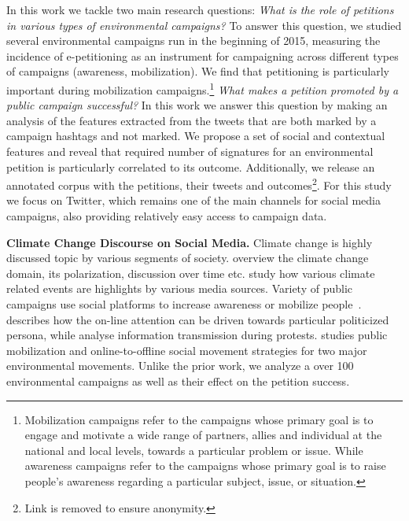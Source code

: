 In this work we tackle two main research questions: 
\textit{What is the role of petitions in various types of environmental campaigns?}
To answer this question, we studied several environmental campaigns run in the beginning of 2015, measuring the incidence of e-petitioning as an instrument for campaigning across different types of campaigns (awareness, mobilization). We find that petitioning is particularly important during mobilization campaigns.\footnote{Mobilization campaigns refer to the campaigns whose primary goal is to engage and motivate a wide range of partners, allies and individual at the national and local levels, towards a particular problem or issue. While awareness campaigns refer to the campaigns whose primary goal is to raise people’s awareness regarding a particular subject, issue, or situation.}
\textit{What makes a petition promoted by a public campaign successful?} In this work we answer this question by making an analysis of the features extracted from the tweets that are both marked by a campaign hashtags and not marked.
%
We propose a set of social and contextual features and reveal that required number of signatures for an environmental petition is particularly correlated to its outcome.
Additionally, we release an annotated corpus with the petitions, their tweets and outcomes\footnote{Link is removed to ensure anonymity.}.
For this study we focus on Twitter, which remains one of the main channels for social media campaigns, also providing relatively easy access to campaign data.

\textbf{Climate Change Discourse on Social Media.} Climate change is highly discussed topic by various segments of society. \cite{Kirilenko2014} overview the climate change domain, its polarization, discussion over time etc. \cite{Olteanu2015} study how various climate related events are highlights by various media sources.
Variety of public campaigns use social platforms to increase awareness or mobilize people~\cite{Mahmud2014}.
\cite{Tufekci2013} describes how the on-line attention can be driven towards particular politicized persona, while \cite{gonzalez2013networked} analyse information transmission during protests.
\cite{hestres2013preaching} studies public mobilization and online-to-offline social movement strategies for two major environmental movements. Unlike the prior work, we analyze a over 100 environmental campaigns as well as their effect on the petition success.

